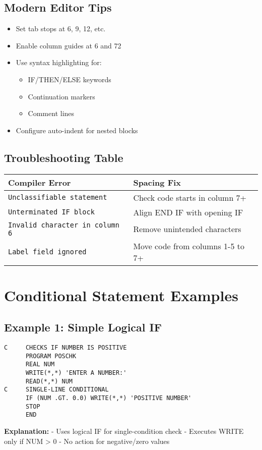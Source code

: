 \documentclass{book}
\begin{document}
\subsection*{Modern Editor Tips}
\begin{itemize}
    \item Set tab stops at 6, 9, 12, etc.
    \item Enable column guides at 6 and 72
    \item Use syntax highlighting for:
    \begin{itemize}
        \item IF/THEN/ELSE keywords
        \item Continuation markers
        \item Comment lines
    \end{itemize}
    \item Configure auto-indent for nested blocks
\end{itemize}

\subsection*{Troubleshooting Table}
\begin{center}
\begin{tabular}{|p{4cm}|p{8cm}|}
\hline
\textbf{Compiler Error} & \textbf{Spacing Fix} \\ 
\hline
\texttt{Unclassifiable statement} & Check code starts in column 7+ \\
\hline
\texttt{Unterminated IF block} & Align END IF with opening IF \\
\hline
\texttt{Invalid character in column 6} & Remove unintended characters \\
\hline
\texttt{Label field ignored} & Move code from columns 1-5 to 7+ \\
\hline
\end{tabular}
\end{center}


\section{Conditional Statement Examples}

\subsection*{Example 1: Simple Logical IF}
\begin{verbatim}
C     CHECKS IF NUMBER IS POSITIVE
      PROGRAM POSCHK
      REAL NUM
      WRITE(*,*) 'ENTER A NUMBER:'
      READ(*,*) NUM
C     SINGLE-LINE CONDITIONAL
      IF (NUM .GT. 0.0) WRITE(*,*) 'POSITIVE NUMBER'
      STOP
      END
\end{verbatim}
\textbf{Explanation:}
- Uses logical IF for single-condition check
- Executes WRITE only if NUM > 0
- No action for negative/zero values
\end{document}
